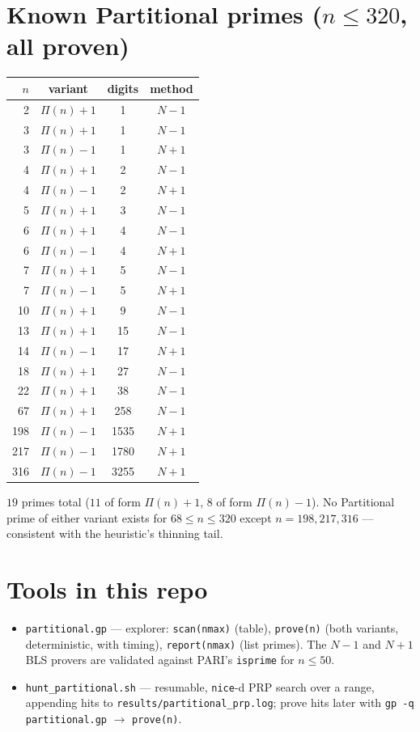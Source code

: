\documentclass[11pt,a4paper]{article}
\newcommand{\Part}{\Pi}                 %
\begin{document}
\section{Known Partitional primes ($n\le320$, all proven)}

\begin{center}
\begin{tabular}{@{}rccc@{}}
\toprule
$n$ & variant & digits & method\\
\midrule
2   & $\Part(n)+1$ & 1    & $N-1$\\
3   & $\Part(n)+1$ & 1    & $N-1$\\
3   & $\Part(n)-1$ & 1    & $N+1$\\
4   & $\Part(n)+1$ & 2    & $N-1$\\
4   & $\Part(n)-1$ & 2    & $N+1$\\
5   & $\Part(n)+1$ & 3    & $N-1$\\
6   & $\Part(n)+1$ & 4    & $N-1$\\
6   & $\Part(n)-1$ & 4    & $N+1$\\
7   & $\Part(n)+1$ & 5    & $N-1$\\
7   & $\Part(n)-1$ & 5    & $N+1$\\
10  & $\Part(n)+1$ & 9    & $N-1$\\
13  & $\Part(n)+1$ & 15   & $N-1$\\
14  & $\Part(n)-1$ & 17   & $N+1$\\
18  & $\Part(n)+1$ & 27   & $N-1$\\
22  & $\Part(n)+1$ & 38   & $N-1$\\
67  & $\Part(n)+1$ & 258  & $N-1$\\
198 & $\Part(n)-1$ & 1535 & $N+1$\\
217 & $\Part(n)-1$ & 1780 & $N+1$\\
316 & $\Part(n)-1$ & 3255 & $N+1$\\
\bottomrule
\end{tabular}
\end{center}

\noindent
$19$ primes total ($11$ of form $\Part(n)+1$, $8$ of form $\Part(n)-1$). No
Partitional prime of either variant exists for $68\le n\le320$ except
$n=198,217,316$ --- consistent with the heuristic's thinning tail.

\section{Tools in this repo}

\begin{itemize}[leftmargin=1.4em]
\item \texttt{partitional.gp} --- explorer: \texttt{scan(nmax)} (table),
  \texttt{prove(n)} (both variants, deterministic, with timing),
  \texttt{report(nmax)} (list primes). The $N-1$ and $N+1$ BLS provers are
  validated against PARI's \texttt{isprime} for $n\le50$.
\item \texttt{hunt\_partitional.sh} --- resumable, \texttt{nice}-d PRP search
  over a range, appending hits to \texttt{results/partitional\_prp.log}; prove
  hits later with \texttt{gp -q partitional.gp} $\to$ \texttt{prove(n)}.
\end{itemize}
\end{document}
